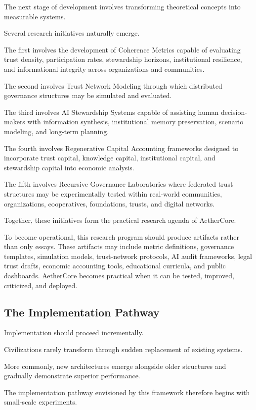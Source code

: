 \documentclass[12pt]{article}
\begin{document}
The next stage of development involves transforming theoretical concepts into measurable systems.

Several research initiatives naturally emerge.

The first involves the development of Coherence Metrics capable of evaluating trust density, participation rates, stewardship horizons, institutional resilience, and informational integrity across organizations and communities.

The second involves Trust Network Modeling through which distributed governance structures may be simulated and evaluated.

The third involves AI Stewardship Systems capable of assisting human decision-makers with information synthesis, institutional memory preservation, scenario modeling, and long-term planning.

The fourth involves Regenerative Capital Accounting frameworks designed to incorporate trust capital, knowledge capital, institutional capital, and stewardship capital into economic analysis.

The fifth involves Recursive Governance Laboratories where federated trust structures may be experimentally tested within real-world communities, organizations, cooperatives, foundations, trusts, and digital networks.

Together, these initiatives form the practical research agenda of AetherCore.

To become operational, this research program should produce artifacts rather than only essays. These artifacts may include metric definitions, governance templates, simulation models, trust-network protocols, AI audit frameworks, legal trust drafts, economic accounting tools, educational curricula, and public dashboards. AetherCore becomes practical when it can be tested, improved, criticized, and deployed.

\subsection{The Implementation Pathway}

Implementation should proceed incrementally.

Civilizations rarely transform through sudden replacement of existing systems.

More commonly, new architectures emerge alongside older structures and gradually demonstrate superior performance.

The implementation pathway envisioned by this framework therefore begins with small-scale experiments.
\end{document}
